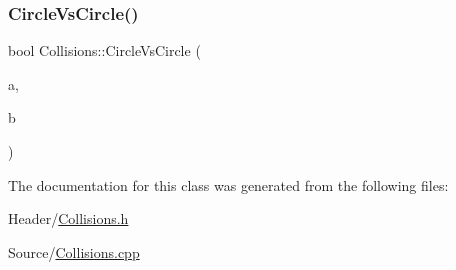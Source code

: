 \subsubsection{\texorpdfstring{CircleVsCircle()}{CircleVsCircle()}}
{\footnotesize\ttfamily bool Collisions\+::\+Circle\+Vs\+Circle (\begin{DoxyParamCaption}\item[{\mbox{\hyperlink{class_collision_circle}{Collision\+Circle}}}]{a,  }\item[{\mbox{\hyperlink{class_collision_circle}{Collision\+Circle}}}]{b }\end{DoxyParamCaption})\hspace{0.3cm}{\ttfamily [static]}}



The documentation for this class was generated from the following files\+:\begin{DoxyCompactItemize}
\item 
Header/\mbox{\hyperlink{_collisions_8h}{Collisions.\+h}}\item 
Source/\mbox{\hyperlink{_collisions_8cpp}{Collisions.\+cpp}}\end{DoxyCompactItemize}
